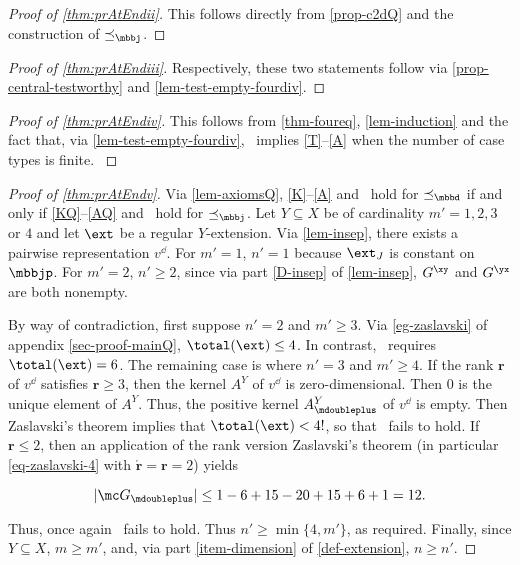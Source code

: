 
\label{proofsection:prAtEndii}\begin{proof}[Proof of \autoref{thm:prAtEndii}]\label{proof:prAtEndii}\label {proof-obs-c2d} This follows directly from \cref {prop-c2dQ} and the construction of $\preceq _{\mbbj }$.\end{proof}
\label{proofsection:prAtEndiii}\begin{proof}[Proof of \autoref{thm:prAtEndiii}]\label{proof:prAtEndiii}\label {proof-obs-c2d} Respectively, these two statements follow via \cref {prop-central-testworthy} and \cref {lem-test-empty-fourdiv}.\end{proof}
\label{proofsection:prAtEndiv}\begin{proof}[Proof of \autoref{thm:prAtEndiv}]\label{proof:prAtEndiv}This follows from \cref {thm-foureq}, \cref {lem-induction} and the fact that, via \cref {lem-test-empty-fourdiv}, \fourpru \ implies \ref {T}--\ref {A} when the number of case types is finite. \label {proof-cor-foureq}\end{proof}
\label{proofsection:prAtEndv}\begin{proof}[Proof of \autoref{thm:prAtEndv}]\label{proof:prAtEndv}Via \cref {lem-axiomsQ}, \ref {K}--\ref {A} and \fourdiv \ hold for $\preceq _{\mbbd }$ if and only if \ref {KQ}--\ref {AQ} and \fourdiv \ hold for $\preceq _{\mbbj }$. Let $Y\subseteq X$ be of cardinality $m' = 1, 2, 3$ or $4$ and let $\ext $ be a regular $Y$-extension. Via \cref {lem-insep}, there exists a pairwise representation $v^{\dd } $. For $m' = 1$, $n' = 1 $ because $\ext _{J}$ is constant on $\mbbjp $. For $m' = 2$, $n' \geq 2$, since via part \ref {D-insep} of \cref {lem-insep}, $G^{\xy }$ and $G^{\yx }$ are both nonempty. \par By way of contradiction, first suppose $n' = 2$ and $m' \geq 3$. Via \cref {eg-zaslavski} of appendix \ref {sec-proof-mainQ}, $\total (\ext ) \leq 4$. In contrast, \fourdiv \ requires $\total (\ext ) = 6$. The remaining case is where $n' = 3$ and $m' \geq 4$. If the rank $\mathbf r$ of $v^{\dd }$ satisfies $\mathbf r \geq 3$, then the kernel $A^{Y}$ of $v^{\dd }$ is zero-dimensional. Then $0$ is the unique element of $ A^{Y}$. Thus, the positive kernel $A^{Y}_{\mdoubleplus }$ of $v^{\dd }$ is empty. Then Zaslavski's theorem implies that $\total (\ext )< 4!$, so that \fourdiv \ fails to hold. If $\mathbf r \leq 2$, then an application of the rank version Zaslavski's theorem (in particular \cref {eq-zaslavski-4} with $\acute {\mathbf r } = \mathbf r = 2$) yields \begin {linenomath*} \[ \lvert \mc G_{\mdoubleplus } \rvert \leq 1 - 6 + 15 - 20 + 15 + 6 + 1 = 12. \] \end {linenomath*} Thus, once again \fourdiv \ fails to hold. Thus $n' \geq \min \{4, m'\}$, as required. Finally, since $Y\subseteq X$, $m\geq m'$, and, via part \ref {item-dimension} of \cref {def-extension}, $n \geq n'$.\end{proof}
